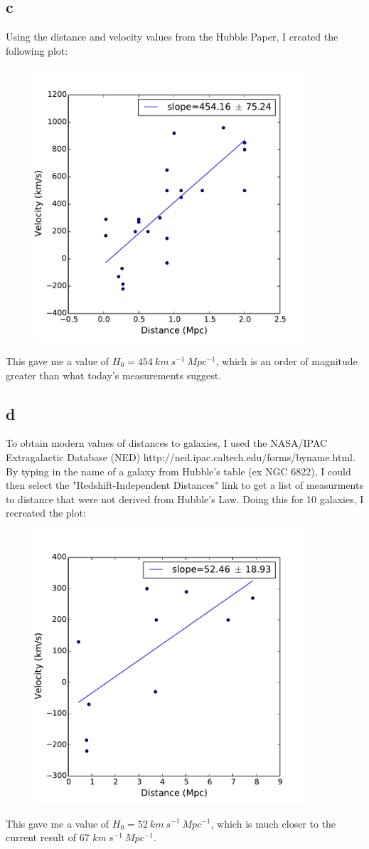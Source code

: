 \documentclass{article}
\begin{document}
\subsection{c}
Using the distance and velocity values from the Hubble Paper, I created the following plot:
\begin{figure}[H]
\includegraphics[width=4in]{HW1_plot}
\end{figure}

This gave me a value of $H_{0} = 454~km~s^{-1}~Mpc^{-1}$, which is an order of magnitude greater than what today's measurements suggest.





\subsection{d}
To obtain modern values of distances to galaxies, I used the NASA/IPAC Extragalactic Database (NED)  http://ned.ipac.caltech.edu/forms/byname.html. By typing in the name of a galaxy from Hubble's table (ex NGC 6822), I could then select the "Redshift-Independent Distances" link to get a list of measurments to distance that were not derived from Hubble's Law. Doing this for 10 galaxies, I recreated the plot: 
\begin{figure}[H]
\includegraphics[width=4in]{HW1_plot2}
\end{figure}


This gave me a value of $H_{0} = 52~km~s^{-1}~Mpc^{-1}$, which is much closer to the current result of 67 $km~s^{-1}~Mpc^{-1}$.
\end{document}
